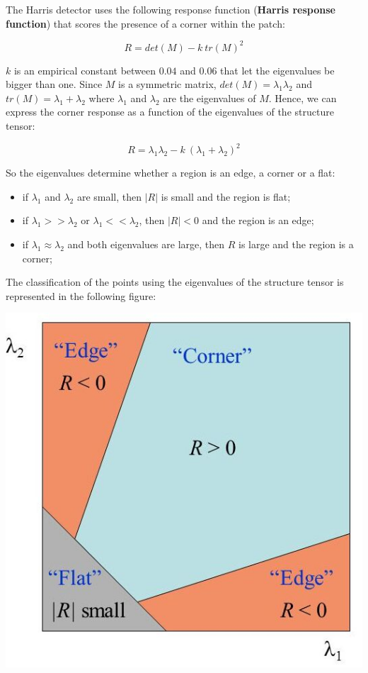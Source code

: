 \documentclass{article}
\begin{document}
The Harris detector uses the following response function (\textbf{Harris response function}) that scores the presence of a corner within the patch:

\begin{equation*}
    R = det(M) - k\ tr(M)^2
\end{equation*}

$k$ is an empirical constant between $0.04$ and $0.06$ that let the eigenvalues be bigger than one. Since $M$ is a symmetric matrix, $det(M) = \lambda_1\lambda_2$ and $tr(M) = \lambda_1 + \lambda_2$ where $\lambda_1$ and $\lambda_2$ are the eigenvalues of $M$. Hence, we can express the corner response as a function of the eigenvalues of the structure tensor:

\begin{equation*}
    R = \lambda_1 \lambda_2 - k\ (\lambda_1 + \lambda_2)^2
\end{equation*}

\newpage

So the eigenvalues determine whether a region is an edge, a corner or a flat:

\begin{itemize}
    \item if $\lambda_1$ and $\lambda_2$ are small, then $|R|$ is small and the region is flat;
    \item if $\lambda_1 >> \lambda_2$ or $\lambda_1 <<\lambda_2$, then $|R| < 0$ and the region is an edge;
    \item if $\lambda_1 \approx \lambda_2$ and both eigenvalues are large, then $R$ is large and the region is a corner;
\end{itemize}

The classification of the points using the eigenvalues of the structure tensor is represented in the following figure:

\begin{center}
    \includegraphics[width=.95\linewidth]{images/eigenvalues.jpg}    
\end{center}
\end{document}
